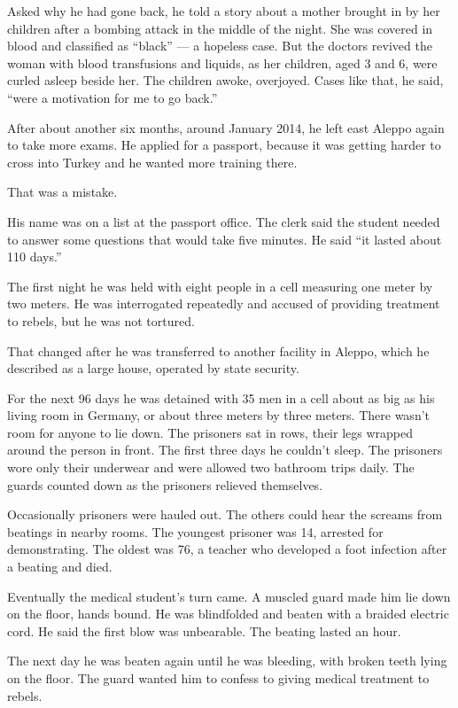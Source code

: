 Asked why he had gone back, he told a story about a mother brought in by
her children after a bombing attack in the middle of the night. She was
covered in blood and classified as ``black'' --- a hopeless case. But
the doctors revived the woman with blood transfusions and liquids, as
her children, aged 3 and 6, were curled asleep beside her. The children
awoke, overjoyed. Cases like that, he said, ``were a motivation for me
to go back.''

After about another six months, around January 2014, he left east Aleppo
again to take more exams. He applied for a passport, because it was
getting harder to cross into Turkey and he wanted more training there.

That was a mistake.

His name was on a list at the passport office. The clerk said the
student needed to answer some questions that would take five minutes. He
said ``it lasted about 110 days.''

The first night he was held with eight people in a cell measuring one
meter by two meters. He was interrogated repeatedly and accused of
providing treatment to rebels, but he was not tortured.

That changed after he was transferred to another facility in Aleppo,
which he described as a large house, operated by state security.

For the next 96 days he was detained with 35 men in a cell about as big
as his living room in Germany, or about three meters by three meters.
There wasn't room for anyone to lie down. The prisoners sat in rows,
their legs wrapped around the person in front. The first three days he
couldn't sleep. The prisoners wore only their underwear and were allowed
two bathroom trips daily. The guards counted down as the prisoners
relieved themselves.

Occasionally prisoners were hauled out. The others could hear the
screams from beatings in nearby rooms. The youngest prisoner was 14,
arrested for demonstrating. The oldest was 76, a teacher who developed a
foot infection after a beating and died.

Eventually the medical student's turn came. A muscled guard made him lie
down on the floor, hands bound. He was blindfolded and beaten with a
braided electric cord. He said the first blow was unbearable. The
beating lasted an hour.

The next day he was beaten again until he was bleeding, with broken
teeth lying on the floor. The guard wanted him to confess to giving
medical treatment to rebels.

